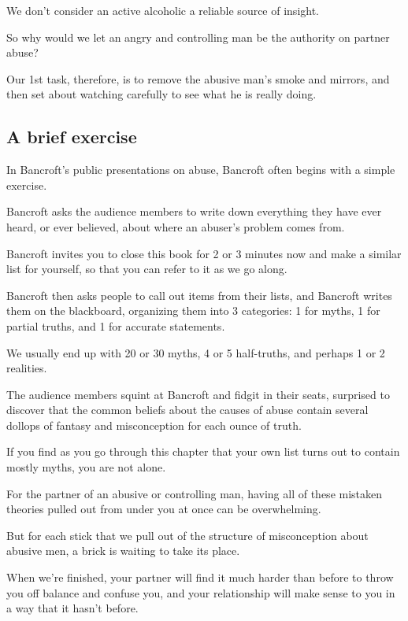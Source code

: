 \documentclass[oneside]{article}
\numberwithin{equation}{section}
\begin{document}
We don't consider an active alcoholic a reliable source of insight.

So why would we let an angry and controlling man be the authority on partner abuse?

Our 1st task, therefore, is to remove the abusive man's smoke and mirrors, and then set about watching carefully to see what he is really doing.

\subsection{A brief exercise}
In Bancroft's public presentations on abuse, Bancroft often begins with a simple exercise.

Bancroft asks the audience members to write down everything they have ever heard, or ever believed, about where an abuser's problem comes from.

Bancroft invites you to close this book for 2 or 3 minutes now and make a similar list for yourself, so that you can refer to it as we go along.

%
Bancroft then asks people to call out items from their lists, and Bancroft writes them on the blackboard, organizing them into 3 categories: 1 for myths, 1 for partial truths, and 1 for accurate statements.

We usually end up with 20 or 30 myths, 4 or 5 half-truths, and perhaps 1 or 2 realities.

The audience members squint at Bancroft and fidgit in their seats, surprised to discover that the common beliefs about the causes of abuse contain several dollops of fantasy and misconception for each ounce of truth.

If you find as you go through this chapter that your own list turns out to contain mostly myths, you are not alone.

%
For the partner of an abusive or controlling man, having all of these mistaken theories pulled out from under you at once can be overwhelming.

But for each stick that we pull out of the structure of misconception about abusive men, a brick is waiting to take its place.

When we're finished, your partner will find it much harder than before to throw you off balance and confuse you, and your relationship will make sense to you in a way that it hasn't before.
\end{document}
